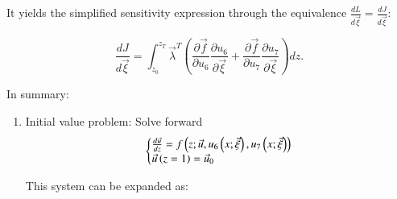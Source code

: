 \documentclass[11pt]{article}
\begin{document}
It yields the simplified sensitivity expression through the equivalence $\frac{{dL}}{{d\vec \xi }} = \frac{{dJ}}{{d\vec \xi }}$:

\begin{equation}
	\frac{{dJ}}{{d\vec \xi }} = \int_{{z_0}}^{{z_T}} {{{\vec \lambda }^T}\left( {\frac{{\partial \vec f}}{{\partial {u_6}}}\frac{{\partial {u_6}}}{{\partial \vec \xi }} + \frac{{\partial \vec f}}{{\partial {u_7}}}\frac{{\partial {u_7}}}{{\partial \vec \xi }}} \right)dz} . 
\end{equation}

In summary:

\begin{enumerate}
	\item  Initial value problem: Solve forward 
	\begin{equation}
		\left\{ \begin{matrix} 
			\frac{{d{\vec u}}}{{dz}} = {f}\left( {z;\vec u,{u_6}\left( {x;\vec \xi } \right), {u_7}\left( {x;\vec \xi } \right)}\right) \hfill \cr 
			{\vec u}\left( {z = 1} \right) = \vec u_0 \hfill \cr 
		\end{matrix}  \right.
		\label{eq0011}
	\end{equation}
		
	This system can be expanded as:
		

\end{enumerate}
\end{document}
